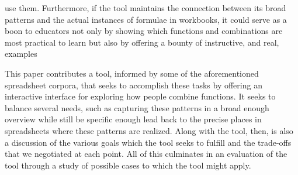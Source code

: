 \documentclass[conference]{IEEEtran}
\begin{document}
use them. Furthermore, if the tool maintains the connection between its broad patterns and the actual instances of
formulae in workbooks, it could serve as a boon to educators not only by showing which functions and combinations are
most practical to learn but also by offering a bounty of instructive, and real, examples \par 
This paper contributes a tool, informed by some of the aforementioned spreadsheet corpora, that seeks to accomplish these 
tasks by offering an interactive interface for exploring how people combine functions. It seeks to balance several needs,
such as capturing these patterns in a broad enough overview while still be specific enough lead back to the precise 
places in spreadsheets where these patterns are realized. Along with the tool, then, is also a discussion of the various
goals which the tool seeks to fulfill and the trade-offs that we negotiated at each point. All of this culminates in an
evaluation of the tool through a study of possible cases to which the tool might apply.
\end{document}
